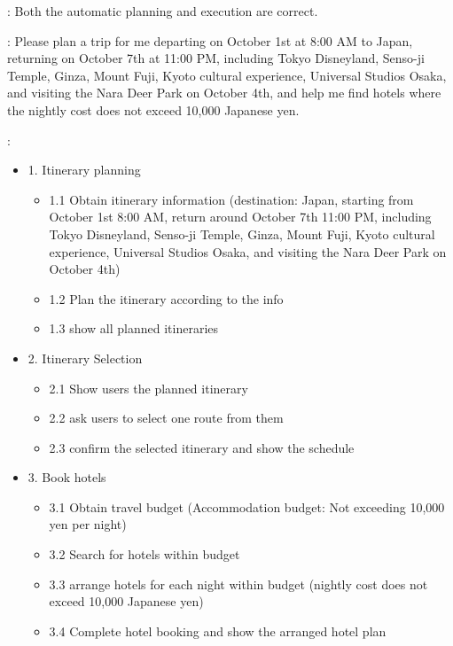 : Both the automatic planning and execution are correct.

: Please plan a trip for me departing on October 1st at 8:00 AM to Japan, returning on October 7th at 11:00 PM, including Tokyo Disneyland, Senso-ji Temple, Ginza, Mount Fuji, Kyoto cultural experience, Universal Studios Osaka, and visiting the Nara Deer Park on October 4th, and help me find hotels where the nightly cost does not exceed 10,000 Japanese yen.

:
\begin{itemize}
    \item 1. Itinerary planning
    \begin{itemize}
        \item 1.1 Obtain itinerary information (destination: Japan, starting from October 1st 8:00 AM, return around October 7th 11:00 PM, including Tokyo Disneyland, Senso-ji Temple, Ginza, Mount Fuji, Kyoto cultural experience, Universal Studios Osaka, and visiting the Nara Deer Park on October 4th)
        \item 1.2 Plan the itinerary according to the info
        \item 1.3 show all planned itineraries
    \end{itemize}
    \item 2. Itinerary Selection
    \begin{itemize}
        \item 2.1 Show users the planned itinerary
        \item 2.2 ask users to select one route from them
        \item 2.3 confirm the selected itinerary and show the schedule
    \end{itemize}
    \item 3. Book hotels
    \begin{itemize}
        \item 3.1 Obtain travel budget (Accommodation budget: Not exceeding 10,000 yen per night)
        \item 3.2 Search for hotels within budget
        \item 3.3 arrange hotels for each night within budget (nightly cost does not exceed 10,000 Japanese yen)
        \item 3.4 Complete hotel booking and show the arranged hotel plan
    \end{itemize}
\end{itemize}

